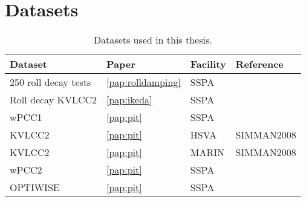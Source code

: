 \section{Datasets}\label{sec:datasets}
\begin{table}[h]
    \caption{Datasets used in this thesis.}
    \label{tab:datasets}
    \centering
    \begin{tabular}{p{3cm}p{0.5cm}p{1cm}p{6cm}}
         \hline
         Dataset & Paper & Facility & Reference \\
         \hline
         250 roll decay tests &  \ref{pap:rolldamping} & SSPA & ~\\
         Roll decay KVLCC2 & \ref{pap:ikeda} & SSPA & \citet{alexanderssonKVLCC2RollDecay2021} \\ 
         wPCC1 & \ref{pap:pit} & SSPA & \citet{alexanderssonWPCCManoeuvringModel2022} \\
         KVLCC2 & \ref{pap:pit} & HSVA & SIMMAN2008 \cite{sternExperienceSIMMAN20082011} \\
         KVLCC2 & \ref{pap:pit} & MARIN & SIMMAN2008 \cite{sternExperienceSIMMAN20082011} \\
         wPCC2 & \ref{pap:pit} & SSPA & \citet{alexanderssonWPCCManoeuvringModel11062024} \\
         OPTIWISE & \ref{pap:pit} & SSPA & ~ \\
         \hline
    \end{tabular}
    
\end{table}